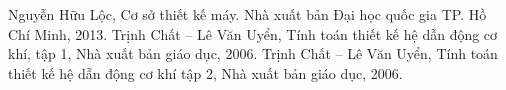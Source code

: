 \documentclass[12pt,a4paper]{report}
\begin{document}
    
    \tableofcontents
    \cleardoublepage
    
    
    
    
    
    
    
    
    
    
    \begin{thebibliography}{9}
        Nguyễn Hữu Lộc, Cơ sở thiết kế máy. Nhà xuất bản Đại học quốc gia TP. Hồ Chí Minh, 2013.
        Trịnh Chất – Lê Văn Uyển, Tính toán thiết kế hệ dẫn động cơ khí, tập 1, Nhà xuất bản giáo dục, 2006.
        Trịnh Chất – Lê Văn Uyển, Tính toán thiết kế hệ dẫn động cơ khí tập 2, Nhà xuất bản giáo dục, 2006.
        \end{thebibliography}
\end{document}
